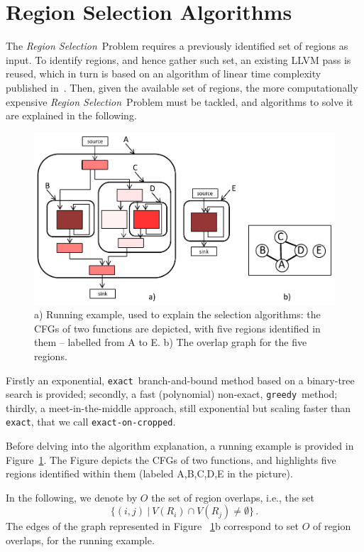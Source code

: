 \documentclass[]{usiinfthesis}
\newcommand{\exact}{\texttt{exact}}
\newcommand{\greedy}{\texttt{greedy}}
\newcommand{\exactC}{\texttt{exact-on-cropped}}
\newcommand{\rsprobname}{\emph{Region Selection}}
\begin{document}
%
%
%
%
%
%
%

\section{Region Selection Algorithms}
\label{sec:rs_algos}


The \rsprobname\ Problem requires a previously identified set of regions
as input. To identify regions, and hence gather such set, an existing LLVM 
pass is reused, which in turn is based on an algorithm of linear
time complexity published in~\cite{JohnsonJun94}. Then, given the
available set of regions, the more computationally expensive
\rsprobname\ Problem must be tackled, and algorithms to solve it are
explained in the following.\par

\begin{figure}
\centering
\includegraphics[width= .7 \linewidth]{figs/exact_example.pdf}
\caption{a) Running example, used to explain the selection algorithms:
  the CFGs of two functions are depicted, with five regions identified
  in them -- labelled from A to E. b) The overlap graph for the five
  regions.}
\label{fig:exact_example}
\end{figure}

Firstly an exponential, \exact\ branch-and-bound method
based on a binary-tree search is provided; secondly, a fast (polynomial)
non-exact, \greedy\ method; thirdly, a meet-in-the-middle approach,
still exponential but scaling faster than \exact, that we call
\exactC.\par

Before delving into the algorithm explanation, a running example
is provided in Figure~\ref{fig:exact_example}. The
Figure depicts the CFGs of two functions, and highlights five regions
identified within them (labeled A,B,C,D,E in the picture).\par
In the following, we denote by $O$ the set of region overlaps, i.e.,
the set
$$
\{ (i, j)\ |\ V(R_i)\cap V(R_j) \neq \emptyset \}\,.
$$
The edges of the graph represented in Figure ~\ref{fig:exact_example}b
correspond to set $O$ of region overlaps, for the running example.
\end{document}
